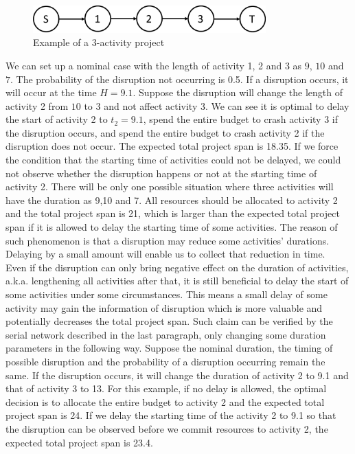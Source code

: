 \documentclass[11pt]{article}
\newcommand{\noi}{\noindent}
\begin{document}
		\begin{figure}[H]
			\centering
			\includegraphics[width=0.8\textwidth]{serial3}
			\caption{Example of a 3-activity project}
			\label{fig:serial3}
		\end{figure}
		\noi We can set up a nominal case with the length of activity 1, 2 and 3 as \(9\), \(10\) and \(7\). The probability of the disruption not occurring is 0.5. If a disruption occurs, it will occur at the time \(H = 9.1\). Suppose the disruption will change the length of activity 2 from \(10\) to \(3\) and not affect activity 3. We can see it is optimal to delay the start of activity 2 to \(t_2 = 9.1\), spend the entire budget to crash activity 3 if the disruption occurs, and spend the entire budget to crash activity 2 if the disruption does not occur. The expected total project span is 18.35. If we force the condition that the starting time of activities could not be delayed, we could not observe whether the disruption happens or not at the starting time of activity 2. There will be only one possible situation where three activities will have the duration as 9,10 and 7. All resources should be allocated to activity 2 and the total project span is 21, which is larger than the expected total project span if it is allowed to delay the starting time of some activities. The reason of such phenomenon is that a disruption may reduce some activities' durations. Delaying by a small amount will enable us to collect that reduction in time.\\
		\newline
		Even if the disruption can only bring negative effect on the duration of activities, a.k.a. lengthening all activities after that, it is still beneficial to delay the start of some activities under some circumstances. This means a small delay of some activity may gain the information of disruption which is more valuable and potentially decreases the total project span. Such claim can be verified by the serial network described in the last paragraph, only changing some duration parameters in the following way. Suppose the nominal duration, the timing of possible disruption and the probability of a disruption occurring remain the same. If the disruption occurs, it will change the duration of activity 2 to 9.1 and that of activity 3 to 13. For this example, if no delay is allowed, the optimal decision is to allocate the entire budget to activity 2 and the expected total project span is 24. If we delay the starting time of the activity 2 to 9.1 so that the disruption can be observed before we commit resources to activity 2, the expected total project span is 23.4. 
\end{document}
